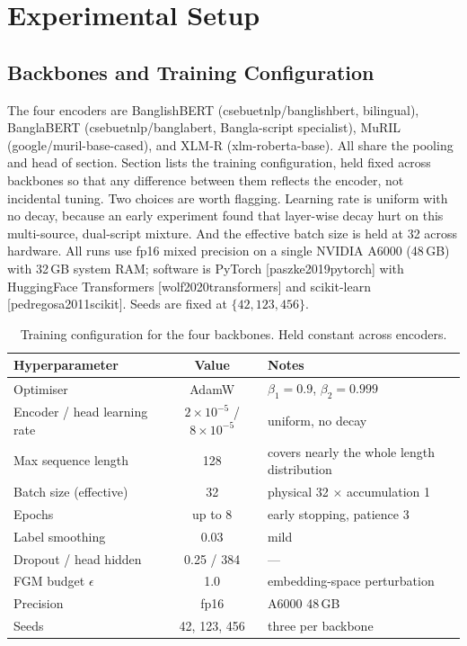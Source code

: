 \documentclass[11pt,a4paper]{article}
\def\citep#1{[#1]}%
\def\Cref#1{Section}%
\def\cref#1{section}%
\def\texttt#1{#1}%
\begin{document}
\section{Experimental Setup}
\label{sec:setup}

\subsection{Backbones and Training Configuration}
\label{sec:config}

The four encoders are BanglishBERT (\texttt{csebuetnlp/\allowbreak banglishbert}, bilingual), BanglaBERT (\texttt{csebuetnlp/\allowbreak banglabert}, Bangla-script specialist), MuRIL (\texttt{google/\allowbreak muril-base-cased}), and XLM-R (\texttt{xlm-roberta-base}). All share the pooling and head of \cref{sec:head}. \Cref{tab:hparams} lists the training configuration, held fixed across backbones so that any difference between them reflects the encoder, not incidental tuning. Two choices are worth flagging. Learning rate is uniform with no decay, because an early experiment found that layer-wise decay hurt on this multi-source, dual-script mixture. And the effective batch size is held at 32 across hardware. All runs use fp16 mixed precision on a single NVIDIA A6000 (48\,GB) with 32\,GB system RAM; software is PyTorch \citep{paszke2019pytorch} with HuggingFace Transformers \citep{wolf2020transformers} and scikit-learn \citep{pedregosa2011scikit}. Seeds are fixed at $\{42, 123, 456\}$.

\begin{table}[!htbp]
\centering
\caption{Training configuration for the four backbones. Held constant across encoders.}
\label{tab:hparams}
\small
\begin{tabularx}{\textwidth}{@{}lcX@{}}
\toprule
\textbf{Hyperparameter} & \textbf{Value} & \textbf{Notes} \\
\midrule
Optimiser & AdamW & $\beta_1 = 0.9$, $\beta_2 = 0.999$ \\
Encoder / head learning rate & $2\times10^{-5}$ / $8\times10^{-5}$ & uniform, no decay \\
Max sequence length & 128 & covers nearly the whole length distribution \\
Batch size (effective) & 32 & physical 32 $\times$ accumulation 1 \\
Epochs & up to 8 & early stopping, patience 3 \\
Label smoothing & 0.03 & mild \\
Dropout / head hidden & 0.25 / 384 & --- \\
FGM budget $\epsilon$ & 1.0 & embedding-space perturbation \\
Precision & fp16 & A6000 48\,GB \\
Seeds & 42, 123, 456 & three per backbone \\
\bottomrule
\end{tabularx}
\end{table}
\end{document}
